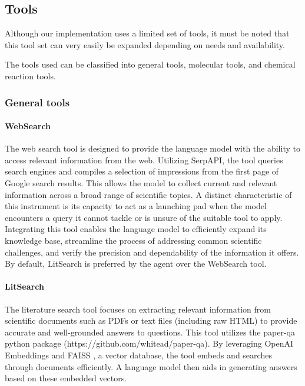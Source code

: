 \documentclass[10pt]{article}
\begin{document}
\subsection{Tools}
\label{sec:tools}
Although our implementation uses a limited set of tools, it must be noted that this tool set can very easily be expanded depending on needs and availability.

The tools used can be classified into general tools, molecular tools, and chemical reaction tools.





\subsubsection{General tools}
\paragraph{WebSearch}
The web search tool is designed to provide the language model with the ability to access relevant information from the web. Utilizing SerpAPI\cite{serpapi}, the tool queries search engines and compiles a selection of impressions from the first page of Google search results. This allows the model to collect current and relevant information across a broad range of scientific topics. A distinct characteristic of this instrument is its capacity to act as a launching pad when the model encounters a query it cannot tackle or is unsure of the suitable tool to apply. Integrating this tool enables the language model to efficiently expand its knowledge base, streamline the process of addressing common scientific challenges, and verify the precision and dependability of the information it offers. By default, LitSearch is preferred by the agent over the WebSearch tool. 

\paragraph{LitSearch}
The literature search tool focuses on extracting relevant information from scientific documents such as PDFs or text files (including raw HTML) to provide accurate and well-grounded answers to questions. This tool utilizes the paper-qa python package (https://github.com/whitead/paper-qa). By leveraging OpenAI Embeddings \cite{neelakantan2022text} and FAISS \cite{johnson2019billion}, a vector database, the tool embeds and searches through documents efficiently. A language model then aids in generating answers based on these embedded vectors.
\end{document}
